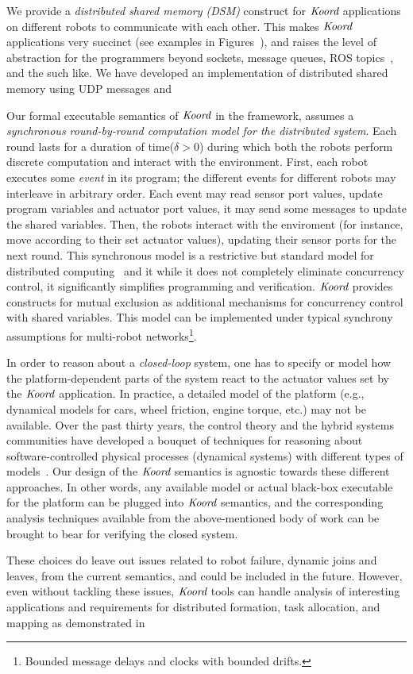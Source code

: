 \begin{noinditem}
\item We provide a {\em distributed shared memory (DSM)\/} construct for $\emph{Koord}$ applications on different robots to communicate with each other. This makes  $\emph{Koord}$ applications very succinct (see examples in Figures~{}), and raises the level of abstraction for the programmers beyond sockets, message queues, ROS topics~\cite{}, and the such like. We have developed an implementation of distributed shared memory using UDP messages and 
\item Our formal executable semantics of $\emph{Koord}$ in the \K framework, assumes a {\em synchronous round-by-round computation model for the distributed system\/}. Each round lasts for a duration of time($\delta >0$) during which both the robots perform discrete computation and interact with the environment. First, each robot executes some {\em event\/} in its program; the different events for different robots may interleave in arbitrary order. Each event may read sensor port values, update program variables and actuator port values, it may send  some messages to update the shared variables. Then, the robots interact with the enviroment (for instance, move according to their set actuator values), updating their sensor ports for the next round. This synchronous model is a restrictive but standard model for distributed computing~\cite{lynch1996a,attiyawelch} and it while it does not completely eliminate concurrency control, it significantly simplifies programming and verification. $\emph{Koord}$ provides constructs for mutual exclusion as additional mechanisms for concurrency control with shared variables. This model can be implemented under typical synchrony assumptions for multi-robot networks\footnote{Bounded message delays and clocks with bounded drifts.}.
\item In order to reason about a {\em closed-loop\/} system,  one has to specify or model how the platform-dependent parts of the system react to the actuator values set by the $\emph{Koord}$ application. In practice, a detailed model of the platform (e.g., dynamical models for cars, wheel friction, engine torque, etc.) may not be available. Over the past thirty years, the control theory and the hybrid systems communities have developed a bouquet of techniques for reasoning about software-controlled physical processes (dynamical systems) with different types of models~\cite{alurbook, platzerbook,seshiabook}. Our design of the  $\emph{Koord}$ semantics is agnostic towards these different approaches. In other words, any available model or actual black-box executable for the platform can be plugged into $\emph{Koord}$ semantics, and the corresponding analysis techniques available from the above-mentioned body of work can be brought to bear for verifying the closed system.
\end{noinditem}
These choices do leave out issues related to robot failure,  dynamic joins and leaves, from the current semantics, and could be included in the future. However, even without tackling these issues, $\emph{Koord}$ tools can handle analysis of interesting applications and requirements for distributed formation, task allocation, and mapping as demonstrated in 

